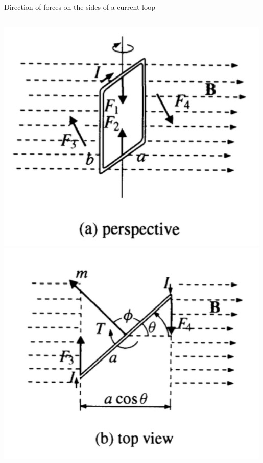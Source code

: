 \begin{frame}{Direction of forces on the sides of a current loop}

\begin{columns}
  \begin{column}{0.37\textwidth}
    \includegraphics[width=0.99\textwidth]{./images/schematics/magnetic_torque_current_loop_perspective.png}\\
    \vspace{0.3cm}
    \includegraphics[width=0.99\textwidth]{./images/schematics/magnetic_torque_current_loop_top_view.png}\\

\end{column}
\end{columns}
\end{frame}
